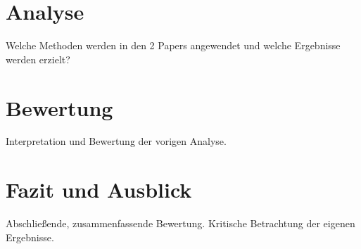 \documentclass[conference]{IEEEtran}
\begin{document}
\section{Analyse}
Welche Methoden werden in den 2 Papers angewendet und welche Ergebnisse werden erzielt?

\section{Bewertung}
Interpretation und Bewertung der vorigen Analyse.

\section{Fazit und Ausblick}
Abschließende, zusammenfassende Bewertung. Kritische Betrachtung der eigenen Ergebnisse.





\end{document}
